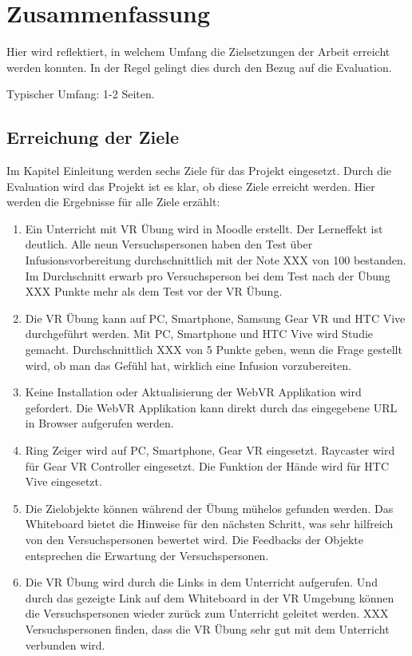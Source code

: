 \chapter{Zusammenfassung}

Hier wird reflektiert, in welchem Umfang die Zielsetzungen der Arbeit erreicht werden konnten. In der Regel gelingt dies durch den Bezug auf die Evaluation.

Typischer Umfang: 1-2 Seiten.

\section{Erreichung der Ziele}

Im Kapitel Einleitung werden sechs Ziele für das Projekt eingesetzt. Durch die Evaluation wird das Projekt ist es klar, ob diese Ziele erreicht werden. Hier werden die Ergebnisse für alle Ziele erzählt:

\begin{enumerate}[labelsep=1ex]
	\renewcommand{\labelenumi}{\textbf{Z\theenumi.}}
	\item Ein Unterricht mit VR Übung wird in Moodle erstellt. Der Lerneffekt ist deutlich. Alle neun Versuchspersonen haben den Test über Infusionsvorbereitung durchschnittlich mit der Note XXX von 100 bestanden. Im Durchschnitt erwarb pro Versuchsperson bei dem Test nach der Übung XXX Punkte mehr als dem Test vor der VR Übung.
	
	\item Die VR Übung kann auf PC, Smartphone, Samsung Gear VR und HTC Vive durchgeführt werden. Mit PC, Smartphone und HTC Vive wird Studie gemacht. Durchschnittlich XXX von 5 Punkte geben, wenn die Frage gestellt wird, ob man das Gefühl hat, wirklich eine Infusion vorzubereiten.
	
	\item Keine Installation oder Aktualisierung der WebVR Applikation wird gefordert. Die WebVR Applikation kann direkt durch das eingegebene URL in Browser aufgerufen werden.
	
	\item Ring Zeiger wird auf PC, Smartphone, Gear VR eingesetzt. Raycaster wird für Gear VR Controller eingesetzt. Die Funktion der Hände wird für HTC Vive eingesetzt.
	
	\item Die Zielobjekte können während der Übung mühelos gefunden werden. Das Whiteboard bietet die Hinweise für den nächsten Schritt, was sehr hilfreich von den Versuchspersonen bewertet wird. Die Feedbacks der Objekte entsprechen die Erwartung der Versuchspersonen.
	
	\item Die VR Übung wird durch die Links in dem Unterricht aufgerufen. Und durch das gezeigte Link auf dem Whiteboard in der VR Umgebung können die Versuchspersonen wieder zurück zum Unterricht geleitet werden. XXX Versuchspersonen finden, dass die VR Übung sehr gut mit dem Unterricht verbunden wird.
	
\end{enumerate}

